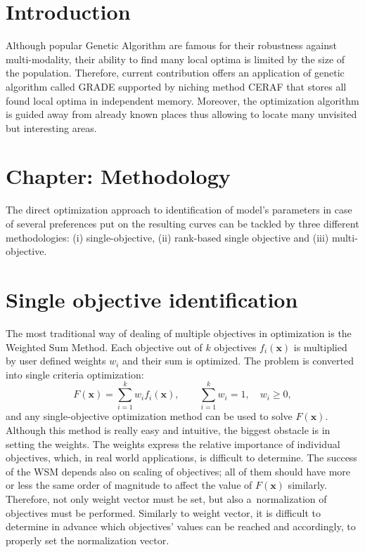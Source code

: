 \documentclass [12pt]{article}
\newcommand\vek[1]{\mathbf{#1}}                       %
\begin{document}
\section{Introduction}

Although popular Genetic Algorithm are famous for their robustness against multi-modality, their ability to find many local optima is limited by the size of the population. Therefore, current contribution offers an application of genetic algorithm called GRADE supported by niching method CERAF that stores all found local optima in independent memory. Moreover, the optimization algorithm is guided away from already known places thus allowing to locate many unvisited but interesting areas.



\section{Chapter: Methodology}

The direct optimization approach to identification of model's parameters in case of several preferences put on the resulting curves can be tackled by three different methodologies: (i) single-objective, (ii) rank-based single objective and (iii) multi-objective.

\section{Single objective identification}

The most traditional way of dealing of multiple objectives in optimization is the Weighted Sum Method. Each objective out of $k$ objectives $f_i(\vek{x})$ is multiplied by user defined weights $w_i$ and their sum is optimized. The problem is converted into single criteria optimization:
%
\begin{equation}\label{MO}
    F(\vek{x}) = \sum_{i=1}^{k} w_i f_i(\vek{x}) , \quad\quad \sum_{i=1}^{k} w_i = 1, \quad w_i \ge 0 ,
\end{equation}
%
and any single-objective optimization method can be used to solve $F(\vek{x})$. Although this method is really easy and intuitive, the biggest obstacle is in setting the weights. The weights express the relative importance of individual objectives, which, in real world applications, is difficult to determine. The success of the WSM depends also on scaling of objectives; all of them should have more or less the same order of magnitude to affect the value of $F(\vek{x})$ similarly. Therefore, not only weight vector must be set, but also a~normalization of objectives must be performed. Similarly to weight vector, it is difficult to determine in advance which objectives' values can be reached and accordingly, to properly set the normalization vector.
\end{document}
